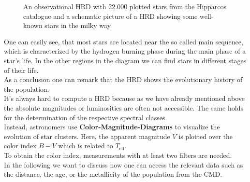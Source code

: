 \begin{figure}[H]
\caption{An observational HRD with 22.000 plotted stars from the Hipparcos catalogue and a schematic picture of a HRD showing some well-known stars in the milky way}
\end{figure}
One can easily see, that most stars are located near the so called main sequence, which is characterized by the hydrogen burning phase during the main phase of a star's life. In the other regions in the diagram we can find stars in different stages of their life. \\
As a conclusion one can remark that the HRD shows the evolutionary history of the population. \\
It's always hard to compute a HRD because as we have already mentioned above the absolute magnitudes or luminosities are often not accessible. The same holds for the determination of the respective spectral classes. \\
Instead, astronomers use \textbf{Color-Magnitude-Diagrams} to visualize the evolution of star clusters. Here, the apparent magnitude $V$ is plotted over the color index $B-V$ which is related to $T_{\text{eff}}$. \\
To obtain the color index, measurements with at least two filters are needed. \\
In the following we want to discuss how one can access the relevant data such as the distance, the age, or the metallicity of the population from the CMD.
